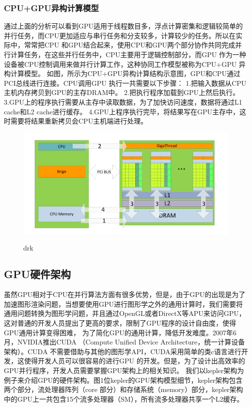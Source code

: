 \subsubsection{CPU+GPU异构计算模型}
通过上面的分析可以看到GPU适用于线程数目多，浮点计算密集和逻辑较简单的并行任务，而CPU更加适应与串行任务和分支较多，计算较少的任务。所以在实际中，常常把CPU 和GPU结合起来，使用CPU和GPU两个部分协作共同完成并行计算任务，在这些并行任务中，CPU主要用于逻辑控制部分，而GPU 作为一种设备被CPU控制调用来做并行计算工作，这种协同工作模型被称为CPU+GPU 异构计算模型。
如图，所示为CPU+GPU异构计算结构示意图，GPU和CPU通过PCI总线进行连接。CPU调用GPU 执行一共需要以下步骤：
\newline
1.把输入数据从CPU主机内存拷贝到GPU的主存DRAM中。\newline
2.把执行程序加载到GPU上然后执行。\newline
3.GPU上的程序执行需要从主存中读取数据，为了加快访问速度，数据将通过L1 cache和L2 cache进行缓存。\newline
4.GPU上程序执行完毕，将结果写在GPU主存中，这时需要将结果重新拷贝会CPU主机端进行处理。\newline
\begin{figure}
\setlength{\belowcaptionskip}{-0.5cm}
  \begin{center}
    {\includegraphics[width=1 \textwidth]{figures/yigou.pdf}}
    \end{center}
  \caption{{\footnotesize{drk}}}
  \label{drk}
\end{figure}
\subsection{GPU硬件架构}
虽然GPU相对于CPU在并行算法方面有很多优势，但是，由于GPU的出现是为了加速图形渲染问题，当想要使用GPU进行图形学之外的通用计算时，我们需要将通用问题转换为图形学问题，并且通过OpenGL或者DirectX等APU来访问GPU，这对普通的开发人员提出了更高的要求，限制了GPU程序的设计自由度，使得GPU通用计算变得困难，
为了简化GPU的通用计算，降低开发难度。2007年6月，NVIDIA推出CUDA （Compute Unified Device Architecture，统一计算设备架构）。CUDA 不需要借助与其他的图形学API，CUDA采用简单的类c语言进行开发，这使得开发人员可以很容易的进行GPU 的开发。但是，为了设计出高效率的GPU并行程序，开发人员需要掌握GPU架构上的相关知识。
我们以kepler架构为例子来介绍GPU的硬件架构。图1位kepler的GPU架构模型细节，kepler架构包含两个部分，流处理器阵列（core 部分）和存储系统（memory）部分，kepler架构中的GPU上一共包含15个流多处理器（SM），所有流多处理器共享一个L2缓存。
